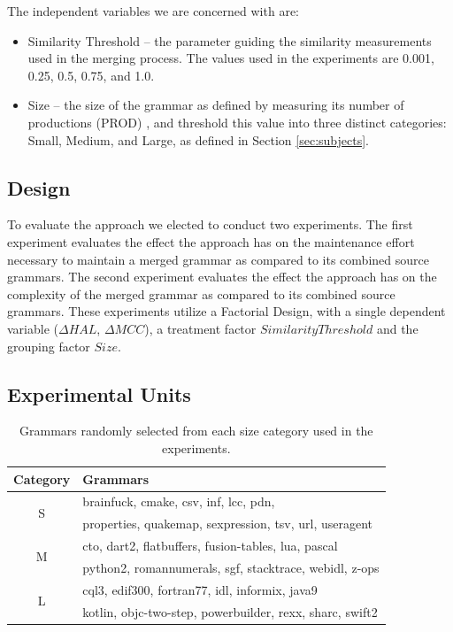 \documentclass[10pt,nocc]{xrese_report}
\begin{document}
\noindent The independent variables we are concerned with are:

\begin{itemize}
\item Similarity Threshold -- the parameter guiding the similarity measurements used in the merging process. The values used in the experiments are 0.001, 0.25, 0.5, 0.75, and 1.0.
\item Size -- the size of the grammar as defined by measuring its number of productions (PROD) \cite{power_metrics_2004}, and threshold this value into three distinct categories: Small, Medium, and Large, as defined in Section \ref{sec:subjects}.
\end{itemize}

\subsection{Design}

To evaluate the approach we elected to conduct two experiments. The first experiment evaluates the effect the approach has on the maintenance effort necessary to maintain a merged grammar as compared to its combined source grammars. The second experiment evaluates the effect the approach has on the complexity of the merged grammar as compared to its combined source grammars. These experiments utilize a Factorial Design, with a single dependent variable ($\Delta HAL$, $\Delta MCC$), a treatment factor $Similarity Threshold$ and the grouping factor $Size$.

\subsection{Experimental Units}

\begin{table}[tb]
\centering
\caption{Grammars randomly selected from each size category used in the experiments.}
\label{tbl:grammar_metrics}
\begin{tabular}{|c|l|}
\hline
Category & Grammars\tabularnewline
\hline
\hline
\multirow{2}{*}{S} & brainfuck, cmake, csv, inf, lcc, pdn,\tabularnewline
\cline{2-2}
 & properties, quakemap, sexpression, tsv, url, useragent\tabularnewline
\hline
\multirow{2}{*}{M} & cto, dart2, flatbuffers, fusion-tables, lua, pascal\tabularnewline
\cline{2-2}
 & python2, romannumerals, sgf, stacktrace, webidl, z-ops\tabularnewline
\hline
\multirow{2}{*}{L} & cql3, edif300, fortran77, idl, informix, java9\tabularnewline
\cline{2-2}
 & kotlin, objc-two-step, powerbuilder, rexx, sharc, swift2\tabularnewline
\hline
\end{tabular}
\end{table}
\end{document}
